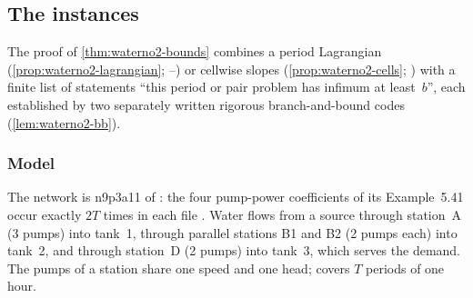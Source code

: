\subsection{The  instances}\label{app:waterno2}

The proof of \cref{thm:waterno2-bounds} combines a period Lagrangian (\cref{prop:waterno2-lagrangian}; --) or cellwise slopes (\cref{prop:waterno2-cells}; ) with a finite list of statements ``this period or pair problem has infimum at least~$b$'', each established by two separately written rigorous branch-and-bound codes (\cref{lem:waterno2-bb}).

\subsubsection{Model}\label{app:waterno2-model}

The network is n9p3a11 of \citet[Section~5.5]{huang2019-optimal-operation-of-water-supply}: the four pump-power coefficients of its Example~5.41 occur exactly $2T$ times in each file .
Water flows from a source through station~A (3 pumps) into tank~1, through parallel stations B1 and B2 (2 pumps each) into tank~2, and through station~D (2 pumps) into tank~3, which serves the demand.
The pumps of a station share one speed and one head;  covers $T$ periods of one hour.

